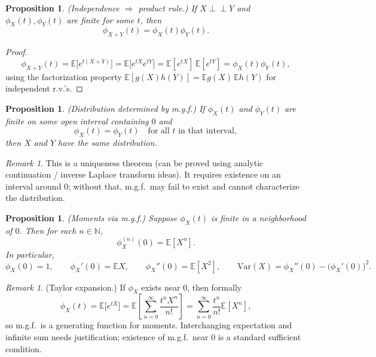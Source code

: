 \documentclass[11pt]{article}
\theoremstyle{plain}
\newtheorem{proposition}[theorem]{Proposition}
\theoremstyle{definition}
\theoremstyle{remark}
\newtheorem{remark}[theorem]{Remark}
\begin{document}
	
	\begin{proposition}
		(Independence \(\Rightarrow\) product rule.)
		If \(X\perp\!\!\!\perp Y\) and \(\phi_X(t),\phi_Y(t)\) are finite for some \(t\), then
		\[
		\phi_{X+Y}(t)=\phi_X(t)\phi_Y(t).
		\]
	\end{proposition}
	
	\begin{proof}
		\[
		\phi_{X+Y}(t)=\mathbb{E}\big[e^{t(X+Y)}\big]
		=\mathbb{E}\big[e^{tX}e^{tY}\big]
		=\mathbb{E}[e^{tX}]\,\mathbb{E}[e^{tY}]
		=\phi_X(t)\phi_Y(t),
		\]
		using the factorization property \(\mathbb{E}[g(X)h(Y)]=\mathbb{E}g(X)\,\mathbb{E}h(Y)\) for independent r.v.'s.
	\end{proof}
	
	\begin{proposition}
		(Distribution determined by m.g.f.)
		If \(\phi_X(t)\) and \(\phi_Y(t)\) are finite on some open interval containing \(0\) and
		\[
		\phi_X(t)=\phi_Y(t)\quad \text{for all \(t\) in that interval},
		\]
		then \(X\) and \(Y\) have the same distribution.
	\end{proposition}
	
	\begin{remark}
	This is a uniqueness theorem (can be proved using analytic continuation / inverse Laplace transform ideas).
		It requires existence on an interval around \(0\); without that, m.g.f.\ may fail to exist and cannot characterize the distribution.
	\end{remark}
	
	\begin{proposition}
		(Moments via m.g.f.)
		Suppose \(\phi_X(t)\) is finite in a neighborhood of \(0\). Then for each \(n\in\mathbb{N}\),
		\[
		\phi_X^{(n)}(0)=\mathbb{E}[X^n].
		\]
		In particular,
		\[
		\phi_X(0)=1,\qquad \phi_X'(0)=\mathbb{E}X,\qquad \phi_X''(0)=\mathbb{E}[X^2],
		\qquad \mathrm{Var}(X)=\phi_X''(0)-\big(\phi_X'(0)\big)^2.
		\]
	\end{proposition}
	
	\begin{remark}
		(Taylor expansion.)
		If \(\phi_X\) exists near \(0\), then formally
		\[
		\phi_X(t)=\mathbb{E}\big[e^{tX}\big]
		=\mathbb{E}\left[\sum_{n=0}^{\infty}\frac{t^nX^n}{n!}\right]
		=\sum_{n=0}^{\infty}\frac{t^n}{n!}\mathbb{E}[X^n],
		\]
		so m.g.f.\ is a generating function for moments.
Interchanging expectation and infinite sum needs justification; existence of m.g.f.\ near \(0\) is a standard sufficient condition.
	\end{remark}
	
\end{document}

